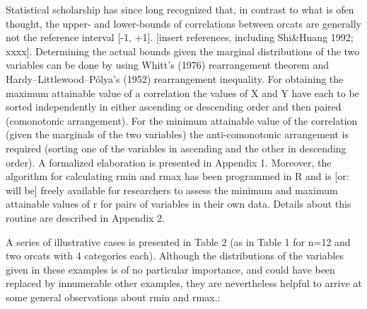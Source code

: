 \documentclass[
  12pt,
]{article}
\theoremstyle{plain}
\theoremstyle{definition}
\theoremstyle{remark}
\begin{document}
Statistical scholarship has since long recognized that, in contrast to
what is ofen thought, the upper- and lower-bounds of correlations
between orcats are generally not the reference interval {[}-1, +1{]}.
{[}insert references, including Shi\&Huang 1992; xxxx{]}. Determining
the actual bounds given the marginal distributions of the two variables
can be done by using Whitt's (1976) rearrangement theorem and
Hardy--Littlewood--Pólya's (1952) rearrangement inequality. For
obtaining the maximum attainable value of a correlation the values of X
and Y have each to be sorted independently in either ascending or
descending order and then paired (comonotonic arrangement). For the
minimum attainable value of the correlation (given the marginals of the
two variables) the anti-comonotonic arrangement is required (sorting one
of the variables in ascending and the other in descending order). A
formalized elaboration is presented in Appendix 1. Moreover, the
algorithm for calculating rmin and rmax has been programmed in R and is
{[}or: will be{]} freely available for researchers to assess the minimum
and maximum attainable values of r for pairs of variables in their own
data. Details about this routine are described in Appendix 2.

A series of illustrative cases is presented in Table 2 (as in Table 1
for n=12 and two orcats with 4 categories each). Although the
distributions of the variables given in these examples is of no
particular importance, and could have been replaced by innumerable other
examples, they are nevertheless helpful to arrive at some general
observations about rmin and rmax.:
\end{document}
